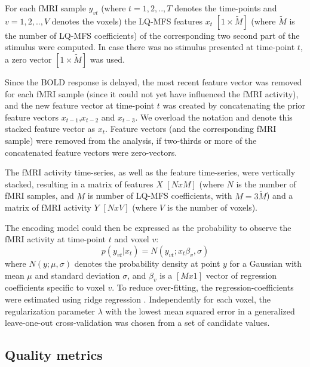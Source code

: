 

For each f{MRI} sample $y_{vt}$ (where $t=1,2,..,T$ denotes the time-points and
$v=1,2,..,V$ denotes the voxels) the LQ-MFS features $x_{t}$ $[1\times\widetilde{M}]$
(where $\widetilde{M}$ is the number of LQ-MFS coefficients) of the
corresponding two second part of the stimulus were computed. In case there was
no stimulus presented at time-point $t$, a zero vector $[1\times\widetilde{M}]$ was
used. 

Since the BOLD response is delayed,  the most recent feature vector was removed
for each f{MRI} sample (since it could not yet have influenced the f{MRI}
activity), and the new feature vector at time-point $t$ was created by
concatenating the prior feature vectors $x_{t-1}$,$x_{t-2}$ and $x_{t-3}$. We
overload the notation and denote this stacked feature vector as $x_{t}$.
Feature vectors (and the corresponding f{MRI} sample) were removed from the
analysis, if two-thirds or more of the concatenated feature vectors were
zero-vectors.

The f{MRI} activity time-series, as well as the feature time-series, were
vertically stacked, resulting in a matrix of features $X$ $[NxM]$ (where $N$ is
the number of f{MRI} samples, and $M$ is number of LQ-MFS coefficients, with
$M=3\widetilde{M}$) and a matrix of f{MRI} activity $Y$ $[NxV]$ (where $V$ is
the number of voxels).

The encoding model could then be expressed as the probability to observe the f{MRI} activity at time-point $t$ and voxel $v$:
%
\begin{equation}
  \label{eq:encmo}
  p(y_{vt}|x_{t}) = N(y_{vt};x_{t}\beta_{v},\sigma)
\end{equation}
%
where $N(y;\mu,\sigma)$ denotes the probability density at point $y$ for a
Gaussian with mean $\mu$ and standard deviation $\sigma$, and $\beta_{v}$ is a
$[Mx1]$ vector of regression coefficients specific to voxel $v$. To reduce
over-fitting, the regression-coefficients were estimated using ridge regression
\citep{HK70}.  Independently for each voxel, the regularization parameter
$\lambda$ with the lowest mean squared error in a generalized leave-one-out
cross-validation \citep{GHW79} was chosen from a set of candidate values.

\subsection*{Quality metrics} 


